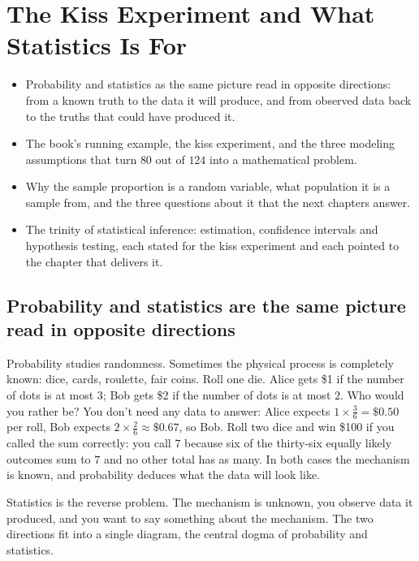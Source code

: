 \chapter{The Kiss Experiment and What Statistics Is For}
\label{ch:kiss}

\begin{chaptergoals}
\begin{itemize}[nosep]
\item Probability and statistics as the same picture read in opposite directions: from a known truth to the data it will produce, and from observed data back to the truths that could have produced it.
\item The book's running example, the kiss experiment, and the three modeling assumptions that turn $80$ out of $124$ into a mathematical problem.
\item Why the sample proportion is a random variable, what population it is a sample from, and the three questions about it that the next chapters answer.
\item The trinity of statistical inference: estimation, confidence intervals and hypothesis testing, each stated for the kiss experiment and each pointed to the chapter that delivers it.
\end{itemize}
\end{chaptergoals}

\section{Probability and statistics are the same picture read in opposite directions}
\label{sec:kiss-dogma}

Probability studies randomness.
Sometimes the physical process is completely known: dice, cards, roulette, fair coins.
Roll one die.
Alice gets \$1 if the number of dots is at most $3$; Bob gets \$2 if the number of dots is at most $2$.
Who would you rather be?
You don't need any data to answer: Alice expects $1 \times \frac{3}{6} = \$0.50$ per roll, Bob expects $2 \times \frac{2}{6} \approx \$0.67$, so Bob.
Roll two dice and win \$100 if you called the sum correctly: you call $7$ because six of the thirty-six equally likely outcomes sum to $7$ and no other total has as many.
In both cases the mechanism is known, and probability deduces what the data will look like.

Statistics is the reverse problem.
The mechanism is unknown, you observe data it produced, and you want to say something about the mechanism.
The two directions fit into a single diagram, the central dogma of probability and statistics.

